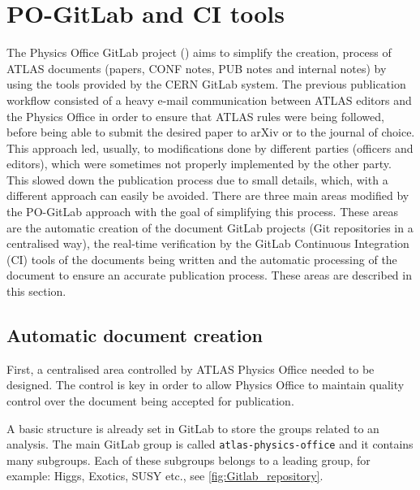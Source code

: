 
\section{PO-GitLab and CI tools}%
\label{sec:PO-Gitlab_and_CI_tools}

The Physics Office GitLab project (\pogitlab) aims to simplify the creation,
 process of ATLAS documents (papers, CONF notes, PUB notes and internal notes) by using the tools provided by the CERN GitLab system.
The previous publication workflow consisted of a heavy e-mail communication between ATLAS editors and the Physics Office in order to ensure that ATLAS rules were being followed, before being able to submit the desired paper to arXiv or to the journal of choice.
This approach led, usually, to modifications done by different parties (officers and editors), which were sometimes not properly implemented by the other party.
This slowed down the publication process due to small details, which, with a different approach can easily be avoided. 
There are three main areas modified by the PO-GitLab approach with the goal of simplifying this process. These areas are the automatic creation of the document GitLab projects (Git repositories in a centralised way), the real-time verification by the GitLab Continuous Integration (CI) tools of the documents being written and the automatic processing of the document to ensure an accurate publication process. These areas are described in this section. 


\subsection{Automatic document creation}%
\label{sec:Automatic_document_creation}

First, a centralised area controlled by ATLAS Physics Office needed to be designed.
The control is key in order to allow Physics Office to maintain quality control over the document being accepted for publication.

A basic structure is already set in GitLab to store the groups related to an analysis.
The main GitLab group is called \texttt{atlas-physics-office} and it contains many subgroups. Each of these subgroups belongs to a leading group, for example: Higgs, Exotics, SUSY etc., see \cref{fig:Gitlab_repository}.

